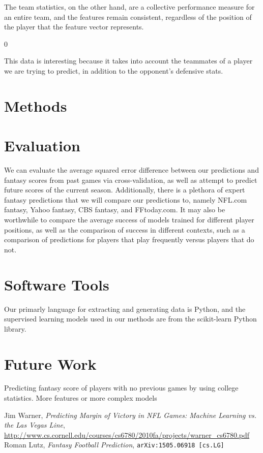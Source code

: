 \documentclass[11pt,a4paper]{article}
\begin{document}
The team statistics, on the other hand, are a collective performance measure for an entire team, and the features remain consistent, regardless of the position of the player that the feature vector represents. 

0

This data is interesting because it takes into account the teammates of a player we are trying to predict, in addition to the opponent's defensive stats. 

\section{Methods}

\section{Evaluation}
We can evaluate the average squared error difference between our predictions and fantasy scores from past games via cross-validation, as well as attempt to predict future scores of the current season. Additionally, there is a plethora of expert fantasy predictions that we will compare our predictions to, namely NFL.com fantasy, Yahoo fantasy, CBS fantasy, and FFtoday.com. It may also be worthwhile to compare the average success of models trained for different player positions, as well as the comparison of success in different contexts, such as a comparison of predictions for players that play frequently versus players that do not.
\section{Software Tools}
Our primarly language for extracting and generating data is Python, and the supervised learning models used in our methods are from the scikit-learn Python library. 

\section{Future Work}
Predicting fantasy score of players with no previous games by using college statistics.
More features or more complex models

\begin{thebibliography}{1}

  Jim Warner,
  \emph{Predicting Margin of Victory in NFL Games: Machine Learning vs. the Las Vegas Line},
  \url{http://www.cs.cornell.edu/courses/cs6780/2010fa/projects/warner_cs6780.pdf}
  Roman Lutz,
  \emph{Fantasy Football Prediction},
  {\tt arXiv:1505.06918 [cs.LG]}
\end{thebibliography}

\end{document}
